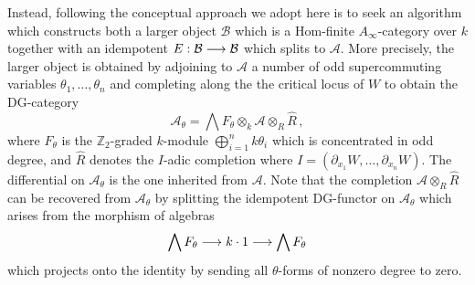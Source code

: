 \documentclass[english,letter paper,12pt,leqno]{article}
\theoremstyle{example}
\numberwithin{equation}{section}
\def\AA{\mathcal{A}}
\def\be{\begin{equation}}
\def\ee{\end{equation}}
\def\nZ{\mathds{Z}}
\begin{document}
Instead, following \cite{pushforward} the conceptual approach we adopt here is to seek an algorithm which constructs both a larger object $\mathcal{B}$ which is a Hom-finite $A_\infty$-category over $k$ together with an idempotent $E: \mathcal{B} \longrightarrow \mathcal{B}$ which splits to $\AA$. More precisely, the larger object is obtained by adjoining to $\AA$ a number of odd supercommuting variables $\theta_1,\ldots,\theta_n$ and completing along the the critical locus of $W$ to obtain the DG-category
\[
\AA_\theta = \bigwedge F_\theta \otimes_k \AA \otimes_R \widehat{R}\,,
\]
where $F_\theta$ is the $\nZ_2$-graded $k$-module $\bigoplus_{i=1}^n k \theta_i$ which is concentrated in odd degree, and $\widehat{R}$ denotes the $I$-adic completion where $I = (\partial_{x_1} W, \ldots, \partial_{x_n} W)$. The differential on $\AA_\theta$ is the one inherited from $\AA$. Note that the completion $\AA \otimes_R \widehat{R}$ can be recovered from $\AA_\theta$ by splitting the idempotent DG-functor on $\AA_\theta$ which arises from the morphism of algebras
\be\label{eq:projector_e}
\bigwedge F_\theta \lto k \cdot 1 \lto \bigwedge F_\theta
\ee
which projects onto the identity by sending all $\theta$-forms of nonzero degree to zero.
\end{document}
